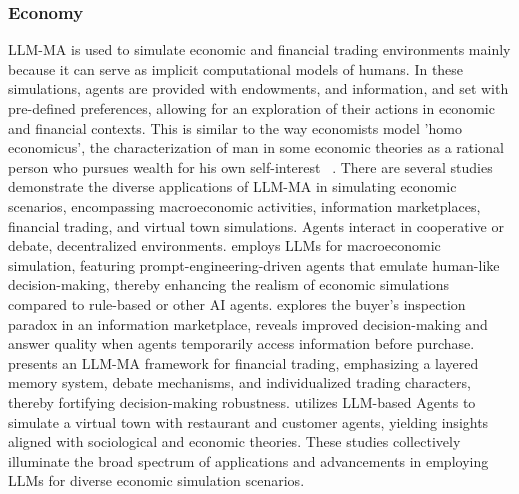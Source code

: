 \subsubsection{Economy}
LLM-MA is used to simulate economic and financial trading environments mainly because it can serve as implicit computational models of humans. In these simulations, agents are provided with endowments, and information, and set with pre-defined preferences, allowing for an exploration of their actions in economic and financial contexts. This is similar to the way economists model 'homo economicus', the characterization of man in some economic theories as a rational person who pursues wealth for his own self-interest ~\cite{horton2023large}. 
There are several studies demonstrate the diverse applications of LLM-MA in simulating economic scenarios, encompassing macroeconomic activities, information marketplaces, financial trading, and virtual town simulations. Agents interact in cooperative or debate, decentralized environments. \cite{li2023large} employs LLMs for macroeconomic simulation, featuring prompt-engineering-driven agents that emulate human-like decision-making, thereby enhancing the realism of economic simulations compared to rule-based or other AI agents. \cite{anonymous2023rethinking} explores the buyer's inspection paradox in an information marketplace, reveals improved decision-making and answer quality when agents temporarily access information before purchase. \cite{li2023tradinggpt} presents an LLM-MA framework for financial trading, emphasizing a layered memory system, debate mechanisms, and individualized trading characters, thereby fortifying decision-making robustness. \cite{zhao2023competeai} utilizes LLM-based Agents to simulate a virtual town with restaurant and customer agents, yielding insights aligned with sociological and economic theories. These studies collectively illuminate the broad spectrum of applications and advancements in employing LLMs for diverse economic simulation scenarios.



